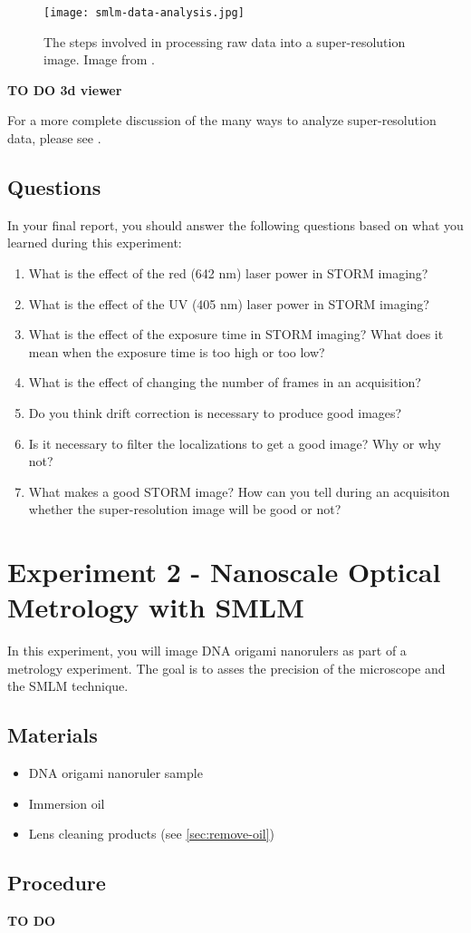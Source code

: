\documentclass[10pt,a4paper,oneside]{book}
\begin{document}
\begin{figure}
    \centering
    \texttt{[image: smlm-data-analysis.jpg]}
    \caption{The steps involved in processing raw data into a super-resolution image. Image from \cite{martens-frontiersinbioinformatics-2022}.}
    \label{fig:smlm-data-analysis}
\end{figure}

\textbf{TO DO 3d viewer}

For a more complete discussion of the many ways to analyze super-resolution data, please see \cite{martens-frontiersinbioinformatics-2022}.

\subsection{Questions}\label{sec:exp1-questions}

In your final report, you should answer the following questions based on what you learned during this experiment:

\begin{enumerate}
    \item{What is the effect of the red (642 nm) laser power in STORM imaging?}
    \item{What is the effect of the UV (405 nm) laser power in STORM imaging?}
    \item{What is the effect of the exposure time in STORM imaging? What does it mean when the exposure time is too high or too low?}
    \item{What is the effect of changing the number of frames in an acquisition?}
    \item{Do you think drift correction is necessary to produce good images?}
    \item{Is it necessary to filter the localizations to get a good image? Why or why not?}
    \item{What makes a good STORM image? How can you tell during an acquisiton whether the super-resolution image will be good or not?}
\end{enumerate}

\section{Experiment 2 - Nanoscale Optical Metrology with SMLM}

In this experiment, you will image DNA origami nanorulers as part of a metrology experiment. The goal is to asses the precision of the microscope and the SMLM technique.

\subsection{Materials}

\begin{itemize}
    \item{DNA origami nanoruler sample}
    \item{Immersion oil}
    \item{Lens cleaning products (see \autoref{sec:remove-oil})}
\end{itemize}

\subsection{Procedure}

\textbf{TO DO}
\end{document}
